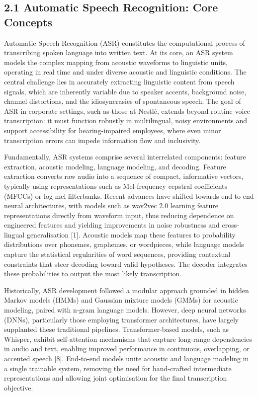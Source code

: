 \documentclass[12pt,a4paper]{article}
\begin{document}
\subsection{2.1 Automatic Speech Recognition: Core Concepts}


Automatic Speech Recognition (ASR) constitutes the computational process of transcribing spoken language into written text. At its core, an ASR system models the complex mapping from acoustic waveforms to linguistic units, operating in real time and under diverse acoustic and linguistic conditions. The central challenge lies in accurately extracting linguistic content from speech signals, which are inherently variable due to speaker accents, background noise, channel distortions, and the idiosyncrasies of spontaneous speech. The goal of ASR in corporate settings, such as those at Nestlé, extends beyond routine voice transcription: it must function robustly in multilingual, noisy environments and support accessibility for hearing-impaired employees, where even minor transcription errors can impede information flow and inclusivity.


Fundamentally, ASR systems comprise several interrelated components: feature extraction, acoustic modeling, language modeling, and decoding. Feature extraction converts raw audio into a sequence of compact, informative vectors, typically using representations such as Mel-frequency cepstral coefficients (MFCCs) or log-mel filterbanks. Recent advances have shifted towards end-to-end neural architectures, with models such as wav2vec 2.0 learning feature representations directly from waveform input, thus reducing dependence on engineered features and yielding improvements in noise robustness and cross-lingual generalisation [1]. Acoustic models map these features to probability distributions over phonemes, graphemes, or wordpieces, while language models capture the statistical regularities of word sequences, providing contextual constraints that steer decoding toward valid hypotheses. The decoder integrates these probabilities to output the most likely transcription.


Historically, ASR development followed a modular approach grounded in hidden Markov models (HMMs) and Gaussian mixture models (GMMs) for acoustic modeling, paired with n-gram language models. However, deep neural networks (DNNs), particularly those employing transformer architectures, have largely supplanted these traditional pipelines. Transformer-based models, such as Whisper, exhibit self-attention mechanisms that capture long-range dependencies in audio and text, enabling improved performance in continuous, overlapping, or accented speech [8]. End-to-end models unite acoustic and language modeling in a single trainable system, removing the need for hand-crafted intermediate representations and allowing joint optimisation for the final transcription objective.
\end{document}
